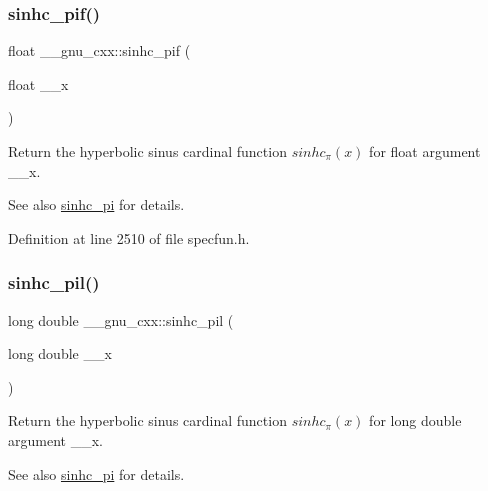 \subsubsection{\texorpdfstring{sinhc\+\_\+pif()}{sinhc\_pif()}}
{\footnotesize\ttfamily float \+\_\+\+\_\+gnu\+\_\+cxx\+::sinhc\+\_\+pif (\begin{DoxyParamCaption}\item[{float}]{\+\_\+\+\_\+x }\end{DoxyParamCaption})\hspace{0.3cm}{\ttfamily [inline]}}

Return the hyperbolic sinus cardinal function $ sinhc_\pi(x) $ for {\ttfamily float} argument {\ttfamily \+\_\+\+\_\+x}.

\begin{DoxySeeAlso}{See also}
\hyperlink{group__gnu__math__spec__func_ga8bb6034e28d48879845bf64818cc06e1}{sinhc\+\_\+pi} for details. 
\end{DoxySeeAlso}


Definition at line 2510 of file specfun.\+h.

\mbox{\label{group__gnu__math__spec__func_gaa572bf7633f457c86cef65bfd6ec4ad9}} 
\subsubsection{\texorpdfstring{sinhc\+\_\+pil()}{sinhc\_pil()}}
{\footnotesize\ttfamily long double \+\_\+\+\_\+gnu\+\_\+cxx\+::sinhc\+\_\+pil (\begin{DoxyParamCaption}\item[{long double}]{\+\_\+\+\_\+x }\end{DoxyParamCaption})\hspace{0.3cm}{\ttfamily [inline]}}

Return the hyperbolic sinus cardinal function $ sinhc_\pi(x) $ for {\ttfamily long double} argument {\ttfamily \+\_\+\+\_\+x}.

\begin{DoxySeeAlso}{See also}
\hyperlink{group__gnu__math__spec__func_ga8bb6034e28d48879845bf64818cc06e1}{sinhc\+\_\+pi} for details. 
\end{DoxySeeAlso}


